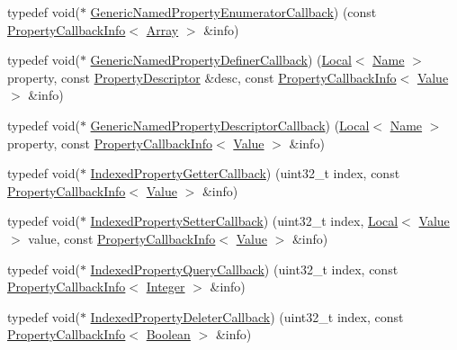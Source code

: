 \begin{DoxyCompactItemize}
\item 
typedef void($\ast$ \mbox{\hyperlink{namespacev8_a20826eb7e52e84fa4f632534e8eddd04}{Generic\+Named\+Property\+Enumerator\+Callback}}) (const \mbox{\hyperlink{classv8_1_1PropertyCallbackInfo}{Property\+Callback\+Info}}$<$ \mbox{\hyperlink{classv8_1_1Array}{Array}} $>$ \&info)
\item 
typedef void($\ast$ \mbox{\hyperlink{namespacev8_a66c854bc88d612ab4c65354bc0dc74a0}{Generic\+Named\+Property\+Definer\+Callback}}) (\mbox{\hyperlink{classv8_1_1Local}{Local}}$<$ \mbox{\hyperlink{classv8_1_1Name}{Name}} $>$ property, const \mbox{\hyperlink{classv8_1_1PropertyDescriptor}{Property\+Descriptor}} \&desc, const \mbox{\hyperlink{classv8_1_1PropertyCallbackInfo}{Property\+Callback\+Info}}$<$ \mbox{\hyperlink{classv8_1_1Value}{Value}} $>$ \&info)
\item 
typedef void($\ast$ \mbox{\hyperlink{namespacev8_a8cf8faa26baffa84173a24906c0d49f6}{Generic\+Named\+Property\+Descriptor\+Callback}}) (\mbox{\hyperlink{classv8_1_1Local}{Local}}$<$ \mbox{\hyperlink{classv8_1_1Name}{Name}} $>$ property, const \mbox{\hyperlink{classv8_1_1PropertyCallbackInfo}{Property\+Callback\+Info}}$<$ \mbox{\hyperlink{classv8_1_1Value}{Value}} $>$ \&info)
\item 
typedef void($\ast$ \mbox{\hyperlink{namespacev8_a48e7816ba64447bf32a25d194588daaf}{Indexed\+Property\+Getter\+Callback}}) (uint32\+\_\+t index, const \mbox{\hyperlink{classv8_1_1PropertyCallbackInfo}{Property\+Callback\+Info}}$<$ \mbox{\hyperlink{classv8_1_1Value}{Value}} $>$ \&info)
\item 
typedef void($\ast$ \mbox{\hyperlink{namespacev8_a4ac7cc6185ebc8b6a199f9fa8e6bf5c3}{Indexed\+Property\+Setter\+Callback}}) (uint32\+\_\+t index, \mbox{\hyperlink{classv8_1_1Local}{Local}}$<$ \mbox{\hyperlink{classv8_1_1Value}{Value}} $>$ value, const \mbox{\hyperlink{classv8_1_1PropertyCallbackInfo}{Property\+Callback\+Info}}$<$ \mbox{\hyperlink{classv8_1_1Value}{Value}} $>$ \&info)
\item 
typedef void($\ast$ \mbox{\hyperlink{namespacev8_a980b62c33eb664783e61e25c3b27f9ee}{Indexed\+Property\+Query\+Callback}}) (uint32\+\_\+t index, const \mbox{\hyperlink{classv8_1_1PropertyCallbackInfo}{Property\+Callback\+Info}}$<$ \mbox{\hyperlink{classv8_1_1Integer}{Integer}} $>$ \&info)
\item 
typedef void($\ast$ \mbox{\hyperlink{namespacev8_a53863728de14cde48dd6543207b2f2da}{Indexed\+Property\+Deleter\+Callback}}) (uint32\+\_\+t index, const \mbox{\hyperlink{classv8_1_1PropertyCallbackInfo}{Property\+Callback\+Info}}$<$ \mbox{\hyperlink{classv8_1_1Boolean}{Boolean}} $>$ \&info)

\end{DoxyCompactItemize}
